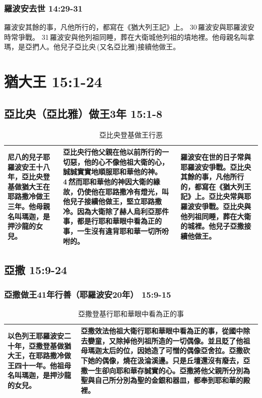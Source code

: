 \subsubsection{羅波安去世 14:29-31}
羅波安其餘的事，凡他所行的，都寫在《猶大列王記》上。 30 羅波安與耶羅波安時常爭戰。 31 羅波安與他列祖同睡，葬在大衛城他列祖的墳地裡。他母親名叫拿瑪，是亞捫人。他兒子亞比央 (又名亞比雅)接續他做王。

\section{猶大王 15:1-24 }
\subsection{亞比央（亞比雅）做王3年 15:1-8 } 
\begin{table}[H]
\centering 
\begin{tabular}{p{3cm}|p{8.5cm}|p{5cm}}\hline\hline
尼八的兒子耶羅波安王十八年，亞比央登基做猶大王在耶路撒冷做王三年。他母親名叫瑪迦，是押沙龍的女兒。
&亞比央行他父親在他以前所行的一切惡，他的心不像他祖大衛的心，誠誠實實地順服耶和華他的神。 4 然而耶和華他的神因大衛的緣故，仍使他在耶路撒冷有燈光，叫他兒子接續他做王，堅立耶路撒冷。因為大衛除了赫人烏利亞那件事，都是行耶和華眼中看為正的事，一生沒有違背耶和華一切所吩咐的。
&羅波安在世的日子常與耶羅波安爭戰。亞比央其餘的事，凡他所行的，都寫在《猶大列王記》上。亞比央常與耶羅波安爭戰。亞比央與他列祖同睡，葬在大衛的城裡。他兒子亞撒接續他做王。\\\hline 
\end{tabular}
\caption{亞比央登基做王行恶}
\end{table}


\subsection{亞撒 15:9-24 } 
\subsubsection{亞撒做王41年行善（耶羅波安20年） 15:9-15}
\begin{table}[H]
\centering 
\begin{tabular}{p{4.25cm}|p{}}\hline\hline
以色列王耶羅波安二十年，亞撒登基做猶大王，在耶路撒冷做王四十一年。他祖母名叫瑪迦，是押沙龍的女兒。
&亞撒效法他祖大衛行耶和華眼中看為正的事，從國中除去孌童，又除掉他列祖所造的一切偶像。並且貶了他祖母瑪迦太后的位，因她造了可憎的偶像亞舍拉。亞撒砍下她的偶像，燒在汲淪溪邊。只是丘壇還沒有廢去，亞撒一生卻向耶和華存誠實的心。亞撒將他父親所分別為聖與自己所分別為聖的金銀和器皿，都奉到耶和華的殿裡。\\\hline 
\end{tabular}
\caption{亞撒登基行耶和華眼中看為正的事}
\end{table}

